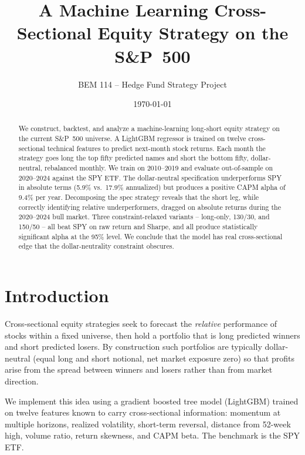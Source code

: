 \documentclass[11pt]{article}
\title{A Machine Learning Cross-Sectional Equity Strategy on the S\&P~500}
\author{BEM 114 -- Hedge Fund Strategy Project}
\date{\today}
\begin{document}
\maketitle

\begin{abstract}
We construct, backtest, and analyze a machine-learning long-short equity strategy on the
current S\&P~500 universe. A LightGBM regressor is trained on twelve cross-sectional
technical features to predict next-month stock returns. Each month the strategy goes long
the top fifty predicted names and short the bottom fifty, dollar-neutral, rebalanced monthly.
We train on 2010--2019 and evaluate out-of-sample on 2020--2024 against the SPY ETF.
The dollar-neutral specification underperforms SPY in absolute terms (5.9\% vs.\ 17.9\%
annualized) but produces a positive CAPM alpha of 9.4\% per year. Decomposing the
spec strategy reveals that the short leg, while correctly identifying relative
underperformers, dragged on absolute returns during the 2020--2024 bull market.
Three constraint-relaxed variants -- long-only, 130/30, and 150/50 -- all beat SPY
on raw return and Sharpe, and all produce statistically significant alpha at the 95\%
level. We conclude that the model has real cross-sectional edge that the
dollar-neutrality constraint obscures.
\end{abstract}

\section{Introduction}
Cross-sectional equity strategies seek to forecast the \emph{relative} performance of
stocks within a fixed universe, then hold a portfolio that is long predicted winners and
short predicted losers. By construction such portfolios are typically dollar-neutral
(equal long and short notional, net market exposure zero) so that profits arise from the
spread between winners and losers rather than from market direction.

We implement this idea using a gradient boosted tree model (LightGBM) trained on twelve
features known to carry cross-sectional information: momentum at multiple horizons,
realized volatility, short-term reversal, distance from 52-week high, volume ratio,
return skewness, and CAPM beta. The benchmark is the SPY ETF.
\end{document}
